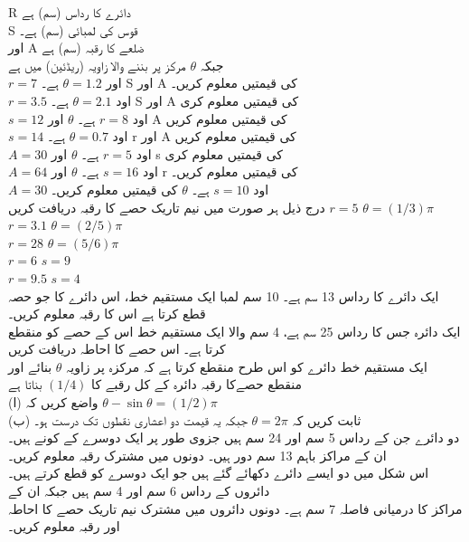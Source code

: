 R
دائرے کا رداس (سم) ہے \\
S
قوس کی لمبائی (سم) ہے۔ \\
اور 
A
ضلعے کا رقبہ (سم) ہے \\
جبکہ 
\(\theta\)
مرکز پر بننے والا زاویہ (ریڈئین) میں ہے\\
\(r=7\)
اور 
\(\theta=1.2\)
ہے۔ 
S
اور 
A
کی قیمتیں معلوم کریں۔ \\
\(r=3.5\)
اود 
\(\theta=2.1\)
ہے۔ 
S
اور 
A
کی قیمتیں معلوم کری\\
\(s=12\)
اود 
\(r=8\)
ہے۔ 
\(\theta\)
اور 
A
کی قیمتیں معلوم کریں\\
\(s=14\)
اود 
\(\theta=0.7\)
ہے۔
r
اور 
A
کی قیمتیں معلوم کریں\\
\(A=30\)
اود 
\(r=5\)
ہے۔
\(\theta\)
اور 
s
کی قیمتیں معلوم کری\\
\(A=64\)
اود 
\(s=16\)
ہے۔
\(\theta\)
اور 
r
کی قیمتیں معلوم کریں۔\\
\(A=30\)
اود 
\(s=10\)
ہے۔
\(\theta\)
کی قیمتیں معلوم کریں۔\\
درج ذیل ہر صورت میں نیم تاریک حصے کا رقبہ دریافت کریں 
\(r=5\)
\(\theta=(1/3)\pi\)\\
\(r=3.1\)
\(\theta=(2/5)\pi\)\\
\(r=28\)
\(\theta=(5/6)\pi\)\\
\(r=6\)
\(s=9\)\\
\(r=9.5\)
\(s=4\)\\
ایک دائرے کا رداس 13 سم ہے۔  10 سم لمبا ایک مستقیم خط، اس دائرے کا جو حصہ قطع کرتا ہے اس کا رقبہ معلوم کریں۔\\
ایک دائرہ جس کا رداس 25 سم ہے، 4 سم والا ایک مستقیم خط اس کے حصے کو منقطع کرتا ہے۔ اس حصے کا احاطہ دریافت کریں\\
ایک مستقیم خط دائرے کو اس طرح منقطع کرتا ہے کہ مرکزہ پر زاویہ 
\(\theta\)
بنائے اور منقطع حصےکا رقبہ دائرہ کے کل رقبے کا
\((1/4)\)
بناتا ہے \\
(ا) واضع کریں کہ 
\(\theta-\sin\theta=(1/2)\pi\)\\
(ب) ثابت کریں کہ 
\(\theta=2\pi\)
جبکہ یہ قیمت دو اعشاری نقطوں تک درست ہو۔ \\
دو دائرے جن کے رداس 5 سم اور 24 سم ہیں جزوی طور پر ایک دوسرے کے کونے ہیں۔ ان کے مراکز باہم 13 سم دور ہیں۔ دونوں میں مشترک رقبہ معلوم کریں۔ \\
اس شکل میں دو ایسے دائرے دکھائے گئے ہیں جو ایک دوسرے کو قطع کرتے ہیں۔ دائروں کے رداس 6 سم اور 4 سم ہیں جبکہ ان کے \\مراکز کا درمیانی فاصلہ 7 سم ہے۔ دونوں دائروں میں مشترک نیم تاریک حصے کا احاطہ اور رقبہ معلوم کریں۔ \\

